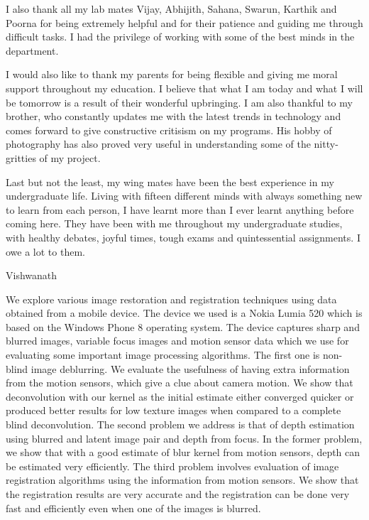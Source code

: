 \documentclass[BTech]{iitmdiss}
\begin{document}
I also thank all my lab mates Vijay, Abhijith, Sahana, Swarun, Karthik and 
Poorna for being extremely helpful and for their patience and guiding me through difficult tasks. I had the privilege of working with some of the best minds in the department.

I would also like to thank my parents for being flexible and giving me moral
support throughout my education. I believe that what I am today and what
I will be tomorrow is a result of their wonderful upbringing. I  am also
thankful to my brother, who constantly updates me with the latest trends
in technology and comes forward to give constructive critisism on my
programs. His hobby of photography has also proved very useful in 
understanding some of the nitty-gritties of my project.

Last but not the least, my wing mates have been the best 
experience in my undergraduate life. Living with fifteen different minds
with always something new to learn from each person, I have learnt more
than I ever learnt anything before coming here. They have been with me
throughout my undergraduate studies, with healthy debates, joyful times,
tough exams and quintessential assignments. I owe a lot to them.

Vishwanath

\abstract
We explore various image restoration and registration techniques using 
data obtained from a mobile device. The device we used is a Nokia Lumia 520 which is based on the Windows Phone 8 operating system. The device captures sharp and blurred images, variable focus images and motion sensor data which we use for evaluating some important image processing algorithms. The first one is non-blind image
deblurring. We evaluate the usefulness of having extra information from the motion sensors, which give a clue about camera motion. We
show that deconvolution with our kernel as the 
initial estimate either converged quicker or produced better results for low
texture images when compared to a complete blind deconvolution. The second problem we address is that of depth estimation using blurred and latent image pair and depth from focus. In the former problem, we show that with a good estimate of blur kernel from motion sensors, depth can be estimated very efficiently. The third problem involves evaluation of image registration algorithms using the information from motion sensors. We show that the registration results are very accurate and the registration can be done very fast and efficiently even when one of the images is blurred.
\end{document}
